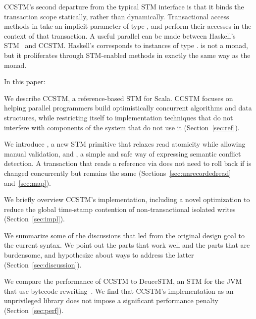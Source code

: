 CCSTM's second departure from the typical STM interface is that it binds the
transaction scope statically, rather than dynamically.  Transactional access
methods in  take an implicit parameter of type , and
perform their accesses in the context of that transaction.
A useful parallel can be made between Haskell's STM~\cite{harris05composable} and CCSTM.
Haskell's  corresponds to instances of type .
 is not a monad, but it proliferates through STM-enabled
methods in exactly the same way as the  monad.

In this paper:
\begin{packed_enum}

\item We describe CCSTM, a reference-based STM for Scala.  CCSTM focuses on
helping parallel programmers build optimistically concurrent algorithms
and data structures, while restricting itself to implementation techniques
that do not interfere with components of the system that do not use it
(Section~\ref{sec:ref}).

\item We introduce , a new STM primitive that relaxes
read atomicity while allowing manual validation, and , a simple
and safe way of expressing semantic conflict detection.  A transaction
that reads a reference  via  does not need to roll
back if  is changed concurrently but  remains
the same (Sections~\ref{sec:unrecordedread} and~\ref{sec:map}).

\item We briefly overview CCSTM's implementation, including a
novel optimization to reduce the global time-stamp contention of
non-transactional isolated writes (Section~\ref{sec:impl}).

\item We summarize some of the discussions that led from the original
design goal to the current syntax.  We point out the parts that work
well and the parts that are burdensome, and hypothesize about ways to
address the latter (Section~\ref{sec:discussion}).

\item We compare the performance of CCSTM to DeuceSTM, an STM for
the JVM that use bytecode rewriting~\cite{deucestm}.
We find that CCSTM's implementation as an
unprivileged library does not impose a significant performance penalty
(Section~\ref{sec:perf}).

\end{packed_enum}

